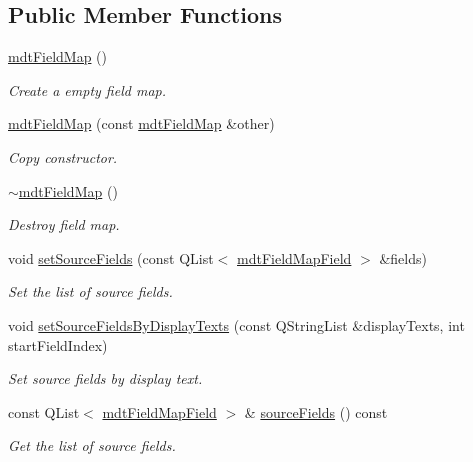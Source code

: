 \subsection*{Public Member Functions}
\begin{DoxyCompactItemize}
\item 
\hyperlink{classmdt_field_map_a7e255a2c818c495fe0b8c09ee1317bcd}{mdt\-Field\-Map} ()
\begin{DoxyCompactList}\small\item\em Create a empty field map. \end{DoxyCompactList}\item 
\hyperlink{classmdt_field_map_a722a46d31ab6520ca280adae21a06b3f}{mdt\-Field\-Map} (const \hyperlink{classmdt_field_map}{mdt\-Field\-Map} \&other)
\begin{DoxyCompactList}\small\item\em Copy constructor. \end{DoxyCompactList}\item 
\hyperlink{classmdt_field_map_acb3e39f5f9cbc6047871000ae561a35e}{$\sim$mdt\-Field\-Map} ()
\begin{DoxyCompactList}\small\item\em Destroy field map. \end{DoxyCompactList}\item 
void \hyperlink{classmdt_field_map_ab9facc102ae7de535d4f54fabc5c6fd2}{set\-Source\-Fields} (const Q\-List$<$ \hyperlink{classmdt_field_map_field}{mdt\-Field\-Map\-Field} $>$ \&fields)
\begin{DoxyCompactList}\small\item\em Set the list of source fields. \end{DoxyCompactList}\item 
void \hyperlink{classmdt_field_map_a70fec473d6f335148722c311552710d2}{set\-Source\-Fields\-By\-Display\-Texts} (const Q\-String\-List \&display\-Texts, int start\-Field\-Index)
\begin{DoxyCompactList}\small\item\em Set source fields by display text. \end{DoxyCompactList}\item 
const Q\-List$<$ \hyperlink{classmdt_field_map_field}{mdt\-Field\-Map\-Field} $>$ \& \hyperlink{classmdt_field_map_a9fc54c201bbea18660f4e88675edf5cf}{source\-Fields} () const 
\begin{DoxyCompactList}\small\item\em Get the list of source fields. \end{DoxyCompactList}\item 

\end{DoxyCompactItemize}
